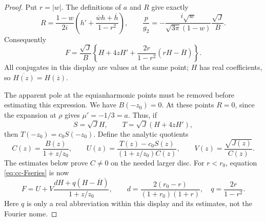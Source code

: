 \begin{proof}
Put $r=|w|$. The definitions of $a$ and $R$ give exactly
\[
 R=\frac{1-w}{2i}
       \left(h'+\frac{\overline w h+\overline h}{1-r^2}\right),
 \qquad
 \frac p{g_2}=-\frac{i\sqrt w}{\sqrt{3\pi}(1-w)}
                         \frac{\sqrt J}{B}.
\]
Consequently
\begin{equation}\label{eq:cc-Fseries}
 F=\frac{\sqrt J}{B}
 \left\{H+4zH'+\frac{2r}{1-r^2}(rH-\overline H)\right\}.
\end{equation}
All conjugates in this display are values at the same point;
$H$ has real coefficients, so $\overline{H(z)}=H(\overline z)$.

The apparent pole at the equianharmonic points must be removed
before estimating this expression. We have $B(-z_0)=0$.
At these points $R=0$, since the expansion at $\rho$ gives
$\mu'=-1/3=a$. Thus, if
\[
 S=\sqrt J H,\qquad T=\sqrt J(H+4zH'),
\]
then $T(-z_0)=c_0S(-z_0)$. Define the analytic quotients
\[
 C(z)=\frac{B(z)}{1+z/z_0},\qquad
 U(z)=\frac{T(z)-c_0S(z)}{(1+z/z_0)C(z)},\qquad
 V(z)=\frac{\sqrt{J(z)}}{C(z)}.
\]
The estimates below prove $C\ne0$ on the needed larger disc.
For $r<r_0$, equation \eqref{eq:cc-Fseries} is now
\begin{equation}\label{eq:cc-Ffactored}
 F=U+V\frac{dH+q(H-\overline H)}{1+z/z_0},
 \qquad
 d=\frac{2(r_0-r)}{(1+r_0)(1+r)},\quad q=\frac{2r}{1-r^2}.
\end{equation}
Here $q$ is only a real abbreviation within this display and
its estimates, not the Fourier nome.


\end{proof}
